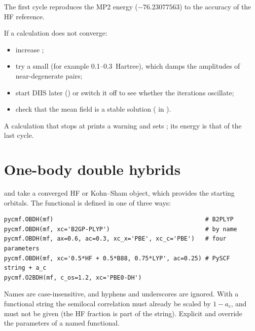 The first cycle reproduces the MP2 energy ($-76.23077563$) to the accuracy
of the HF reference.

If a calculation does not converge:

\begin{itemize}
  \item increase ;
  \item try a small  (for example 0.1--0.3~Hartree), which
        damps the amplitudes of near-degenerate pairs;
  \item start DIIS later () or switch it off to see
        whether the iterations oscillate;
  \item check that the mean field is a stable solution
        ( in \pyscf{}).
\end{itemize}

A calculation that stops at  prints a warning and sets
; its energy is that of the last cycle.

\section{One-body double hybrids}
\label{sec:obdh}

 and  take a converged HF or Kohn--Sham object, which
provides the starting orbitals. The functional is defined in one of three
ways:

\begin{lstlisting}[style=python]
pycmf.OBDH(mf)                                           # B2PLYP
pycmf.OBDH(mf, xc='B2GP-PLYP')                           # by name
pycmf.OBDH(mf, ax=0.6, ac=0.3, xc_x='PBE', xc_c='PBE')   # four parameters
pycmf.OBDH(mf, xc='0.5*HF + 0.5*B88, 0.75*LYP', ac=0.25) # PySCF string + a_c
pycmf.O2BDH(mf, c_os=1.2, xc='PBE0-DH')
\end{lstlisting}

Names are case-insensitive, and hyphens and underscores are ignored. With a
functional string the semilocal correlation must already be scaled by
$1-a_c$, and  must not be given (the HF fraction is part of the
string). Explicit  and  override the parameters of a named
functional.

